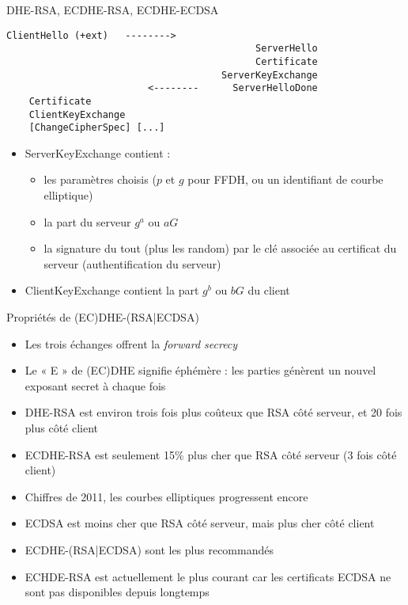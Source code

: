 \documentclass{mpg-ep-slides}
\begin{document}
\begin{frame}[containsverbatim]{DHE-RSA, ECDHE-RSA, ECDHE-ECDSA}
  \begin{Verbatim}[gobble=4, fontsize=\small]
    ClientHello (+ext)   -------->
                                            ServerHello
                                            Certificate
                                      ServerKeyExchange
                         <--------      ServerHelloDone
    Certificate
    ClientKeyExchange
    [ChangeCipherSpec] [...]
  \end{Verbatim}
  \begin{itemize}
    \item ServerKeyExchange contient :
      \begin{itemize}
        \item les paramètres choisis ($p$ et $g$ pour FFDH, ou un identifiant
          de courbe elliptique)
        \item la part du serveur $g^a$ ou $aG$
        \item la signature du tout (plus les random) par le clé associée au
          certificat du serveur (authentification du serveur)
      \end{itemize}
    \item ClientKeyExchange contient la part $g^b$ ou $bG$ du client
  \end{itemize}
\end{frame}

\begin{frame}{Propriétés de (EC)DHE-(RSA|ECDSA)}
  \begin{itemize}
    \item Les trois échanges offrent la \emph{forward secrecy}
    \item Le « E » de (EC)DHE signifie éphémère : les parties génèrent un
      nouvel exposant secret à chaque fois
    \item DHE-RSA est environ trois fois plus coûteux que RSA côté serveur, et
      20 fois plus côté client
    \item ECDHE-RSA est seulement 15\% plus cher que RSA côté serveur (3 fois
      côté client)
    \item Chiffres de 2011, les courbes elliptiques progressent encore
    \item ECDSA est moins cher que RSA côté serveur, mais plus cher côté client
    \item ECDHE-(RSA|ECDSA) sont les plus recommandés
    \item ECHDE-RSA est actuellement le plus courant car les certificats ECDSA
      ne sont pas disponibles depuis longtemps
  \end{itemize}
\end{frame}
\end{document}
